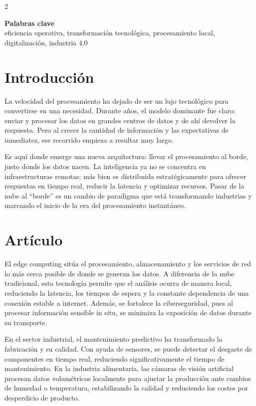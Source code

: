 \documentclass[10pt,spanish,Letterpaper,openany]{book}
\let\origtextbf\textbf
\renewcommand{\textbf}[1]{{\color{textlinetitle}\origtextbf{#1}}}
\begin{document}
\begin {multicols}{2}

\textbf{Palabras clave}\\
eficiencia operativa, transformación tecnológica, procesamiento local, digitalización, industria 4.0

\section{Introducción}\label{introducciuxf3n-2}

La velocidad del procesamiento ha dejado de ser un lujo tecnológico para convertirse en una necesidad. Durante años, el modelo dominante fue claro: enviar y procesar los datos en grandes centros de datos y de ahí devolver la respuesta. Pero al crecer la cantidad de información y las expectativas de inmediatez, ese recorrido empieza a resultar muy largo.

Es aquí donde emerge una nueva arquitectura: llevar el procesamiento al borde, justo donde los datos nacen. La inteligencia ya no se concentra en infraestructuras remotas; más bien es distribuida estratégicamente para ofrecer respuestas en tiempo real, reducir la latencia y optimizar recursos. Pasar de la nube al ``borde'' es un cambio de paradigma que está transformando industrias y marcando el inicio de la era del procesamiento instantáneo.

\section{Artículo}\label{artuxedculo-1}

El edge computing sitúa el procesamiento, almacenamiento y los servicios de red lo más cerca posible de donde se generan los datos. A diferencia de la nube tradicional, esta tecnología permite que el análisis ocurra de manera local, reduciendo la latencia, los tiempos de espera y la constante dependencia de una conexión estable a internet. Además, se fortalece la ciberseguridad, pues al procesar información sensible in situ, se minimiza la exposición de datos durante su transporte.

En el sector industrial, el mantenimiento predictivo ha transformado la fabricación y su calidad. Con ayuda de sensores, se puede detectar el desgaste de componentes en tiempo real, reduciendo significativamente el tiempo de mantenimiento. En la industria alimentaria, las cámaras de visión artificial procesan datos volumétricos localmente para ajustar la producción ante cambios de humedad o temperatura, estabilizando la calidad y reduciendo los costes por desperdicio de producto.


\end{multicols}
\end{document}
